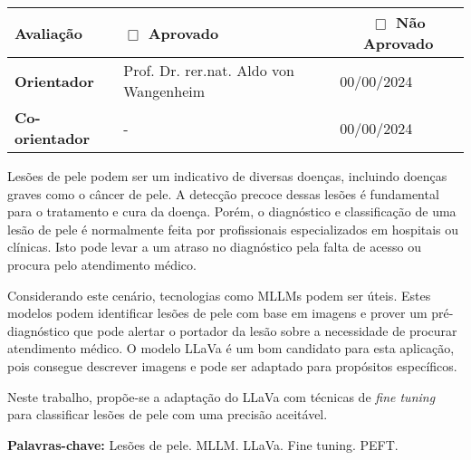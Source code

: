 \begin{folhadeaprovacao}
	\vspace{-4pt}

	\tiny
	\noindent \begin{tabularx}{\textwidth}{| l | X | l | l |}
		\hline
		{\textbf{Avaliação}}     & \multicolumn{1}{l}{\textbf{$\Box$ Aprovado}} & \multicolumn{2}{c|}{\textbf{$\Box$ Não Aprovado}}   \\ \hline
		{\textbf{Orientador}}    & {Prof. Dr. rer.nat. Aldo von Wangenheim}     & {00/00/2024}                                      & \\ \hline
		{\textbf{Co-orientador}} & {-}                                          & {00/00/2024}                                      & \\ \hline
	\end{tabularx}
\end{folhadeaprovacao}

\setlength{\absparsep}{18pt}
\begin{resumo}
	\SingleSpacing

	Lesões de pele podem ser um indicativo de diversas doenças, incluindo doenças graves como o câncer de pele. A detecção precoce dessas lesões é fundamental para o
	tratamento e cura da doença. Porém, o diagnóstico e classificação de uma lesão de pele é normalmente feita por profissionais especializados em hospitais ou clínicas.
	Isto pode levar a um atraso no diagnóstico pela falta de acesso ou procura pelo atendimento médico.

	Considerando este cenário, tecnologias como \ac{MLLMs} podem ser úteis. Estes modelos podem identificar lesões de pele com base em imagens e prover um pré-diagnóstico
	que pode alertar o portador da lesão sobre a necessidade de procurar atendimento médico. O modelo \ac{LLaVa} é um bom candidato para esta aplicação, pois consegue
	descrever imagens e pode ser adaptado para propósitos específicos.

	Neste trabalho, propõe-se a adaptação do \ac{LLaVa} com técnicas de \textit{fine tuning} para classificar lesões de pele com uma precisão aceitável.

	\textbf{Palavras-chave:} Lesões de pele. MLLM. LLaVa. Fine tuning. PEFT.
\end{resumo}



{
\hypersetup{hidelinks}

\imprimirlistadesiglas

\tableofcontents*
\cleardoublepage
}
